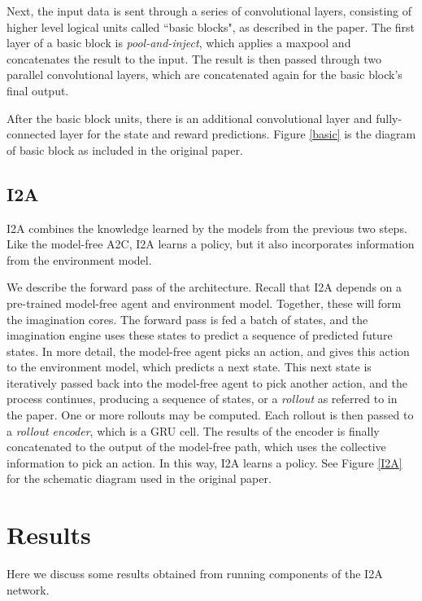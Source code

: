 \documentclass[10pt, twocolumn]{article}
\begin{document}
Next, the input data is sent through a series of convolutional layers, consisting of higher level logical units
called ``basic blocks", as described in the paper. The first layer of a basic block is \emph{pool-and-inject},
which applies a maxpool and concatenates the result to the input. The result is then passed through
two parallel convolutional layers, which are concatenated again for the basic block's final output.

After the basic block units, there is an additional convolutional layer and fully-connected layer for the
state and reward predictions. Figure \ref{basic} is the diagram of basic block as included in the original paper.



\subsection{I2A}

I2A combines the knowledge learned by the models from the previous two steps. Like the model-free A2C, I2A learns a policy, but it also incorporates information from the environment model.

We describe the forward pass of the architecture. Recall that I2A depends on a pre-trained model-free agent and environment model. Together, these will form the imagination cores. The forward pass is fed a batch of states, and the imagination engine uses these states to predict a sequence of predicted future states. In more detail, the model-free agent picks an action, and gives this action to the environment model, which predicts a next state. This next state is iteratively passed back into the model-free agent to pick another action, and the process continues, producing a sequence of states, or a \emph{rollout} as referred to in the paper. One or more rollouts may be computed. Each rollout is then passed to a \emph{rollout encoder}, which is a GRU cell. The results of the encoder is finally concatenated to the output of the model-free path, which uses the collective information to pick an action. In this way, I2A learns a policy. See Figure \ref{I2A} for the schematic diagram used in the original paper.

\section{Results}

Here we discuss some results obtained from running components of the I2A network.
\end{document}
